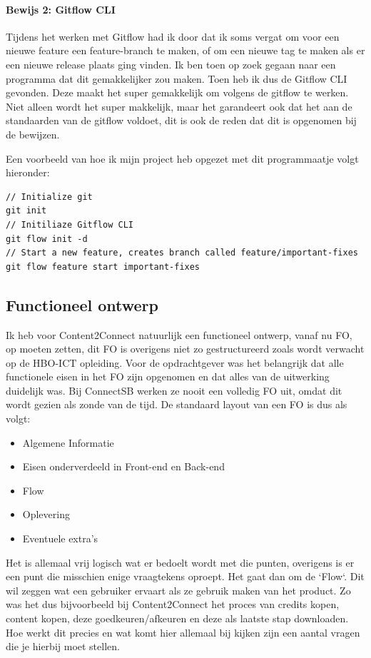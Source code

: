 \paragraph{Bewijs 2: Gitflow CLI}
Tijdens het werken met Gitflow had ik door dat ik soms vergat om voor een nieuwe feature een feature-branch te maken, of om een nieuwe tag te maken als er een nieuwe release plaats ging vinden. Ik ben toen op zoek gegaan naar een programma dat dit gemakkelijker zou maken. Toen heb ik dus de Gitflow CLI\cite{gitflowcli} gevonden. Deze maakt het super gemakkelijk om volgens de \gls{gitflow} te werken. Niet alleen wordt het super makkelijk, maar het garandeert ook dat het aan de standaarden van de \gls{gitflow} voldoet, dit is ook de reden dat dit is opgenomen bij de bewijzen.

Een voorbeeld van hoe ik mijn project heb opgezet met dit programmaatje volgt hieronder:

\begin{lstlisting}[caption=Aanmaken Gitflow project]
// Initialize git
git init
// Initiliaze Gitflow CLI
git flow init -d
// Start a new feature, creates branch called feature/important-fixes
git flow feature start important-fixes
\end{lstlisting}

\clearpage

\subsection{Functioneel ontwerp}
Ik heb voor Content2Connect natuurlijk een functioneel ontwerp, vanaf nu FO, op moeten zetten, dit FO is overigens niet zo gestructureerd zoals wordt verwacht op de HBO-ICT opleiding. Voor de opdrachtgever was het belangrijk dat alle functionele eisen in het FO zijn opgenomen en dat alles van de uitwerking duidelijk was. Bij ConnectSB werken ze nooit een volledig FO uit, omdat dit wordt gezien als zonde van de tijd. De standaard layout van een FO is dus als volgt:
\begin{itemize}
\item Algemene Informatie
\item Eisen onderverdeeld in Front-end en Back-end
\item Flow
\item Oplevering
\item Eventuele extra's
\end{itemize}
Het is allemaal vrij logisch wat er bedoelt wordt met die punten, overigens is er een punt die misschien enige vraagtekens oproept. Het gaat dan om de `Flow`. Dit wil zeggen wat een gebruiker ervaart als ze gebruik maken van het product. Zo was het dus bijvoorbeeld bij Content2Connect het proces van credits kopen, content kopen, deze goedkeuren/afkeuren en deze als laatste stap downloaden. Hoe werkt dit precies en wat komt hier allemaal bij kijken zijn een aantal vragen die je hierbij moet stellen.

